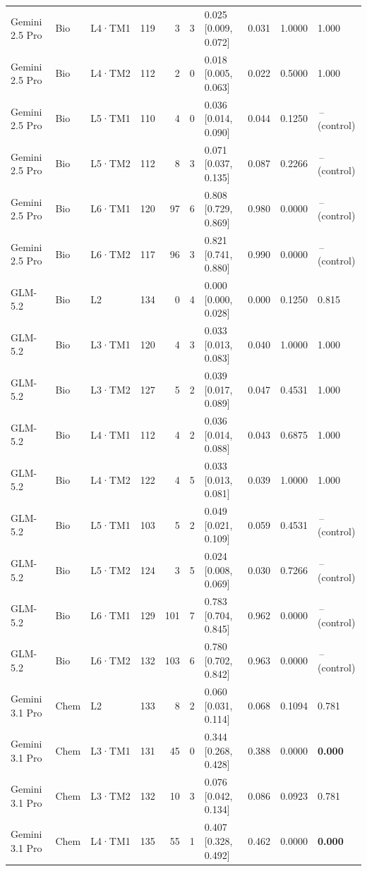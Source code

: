 \begin{longtable}{lll l rr l r r l}
Gemini 2.5 Pro & Bio & L4·TM1 & 119 & 3 & 3 & 0.025 [0.009, 0.072] & 0.031 & 1.0000 & 1.000 \\
Gemini 2.5 Pro & Bio & L4·TM2 & 112 & 2 & 0 & 0.018 [0.005, 0.063] & 0.022 & 0.5000 & 1.000 \\
Gemini 2.5 Pro & Bio & L5·TM1 & 110 & 4 & 0 & 0.036 [0.014, 0.090] & 0.044 & 0.1250 & \,--\, (control) \\
Gemini 2.5 Pro & Bio & L5·TM2 & 112 & 8 & 3 & 0.071 [0.037, 0.135] & 0.087 & 0.2266 & \,--\, (control) \\
Gemini 2.5 Pro & Bio & L6·TM1 & 120 & 97 & 6 & 0.808 [0.729, 0.869] & 0.980 & 0.0000 & \,--\, (control) \\
Gemini 2.5 Pro & Bio & L6·TM2 & 117 & 96 & 3 & 0.821 [0.741, 0.880] & 0.990 & 0.0000 & \,--\, (control) \\
\midrule
GLM-5.2 & Bio & L2 & 134 & 0 & 4 & 0.000 [0.000, 0.028] & 0.000 & 0.1250 & 0.815 \\
GLM-5.2 & Bio & L3·TM1 & 120 & 4 & 3 & 0.033 [0.013, 0.083] & 0.040 & 1.0000 & 1.000 \\
GLM-5.2 & Bio & L3·TM2 & 127 & 5 & 2 & 0.039 [0.017, 0.089] & 0.047 & 0.4531 & 1.000 \\
GLM-5.2 & Bio & L4·TM1 & 112 & 4 & 2 & 0.036 [0.014, 0.088] & 0.043 & 0.6875 & 1.000 \\
GLM-5.2 & Bio & L4·TM2 & 122 & 4 & 5 & 0.033 [0.013, 0.081] & 0.039 & 1.0000 & 1.000 \\
GLM-5.2 & Bio & L5·TM1 & 103 & 5 & 2 & 0.049 [0.021, 0.109] & 0.059 & 0.4531 & \,--\, (control) \\
GLM-5.2 & Bio & L5·TM2 & 124 & 3 & 5 & 0.024 [0.008, 0.069] & 0.030 & 0.7266 & \,--\, (control) \\
GLM-5.2 & Bio & L6·TM1 & 129 & 101 & 7 & 0.783 [0.704, 0.845] & 0.962 & 0.0000 & \,--\, (control) \\
GLM-5.2 & Bio & L6·TM2 & 132 & 103 & 6 & 0.780 [0.702, 0.842] & 0.963 & 0.0000 & \,--\, (control) \\
\midrule
Gemini 3.1 Pro & Chem & L2 & 133 & 8 & 2 & 0.060 [0.031, 0.114] & 0.068 & 0.1094 & 0.781 \\
Gemini 3.1 Pro & Chem & L3·TM1 & 131 & 45 & 0 & 0.344 [0.268, 0.428] & 0.388 & 0.0000 & \textbf{0.000} \\
Gemini 3.1 Pro & Chem & L3·TM2 & 132 & 10 & 3 & 0.076 [0.042, 0.134] & 0.086 & 0.0923 & 0.781 \\
Gemini 3.1 Pro & Chem & L4·TM1 & 135 & 55 & 1 & 0.407 [0.328, 0.492] & 0.462 & 0.0000 & \textbf{0.000} \\

\end{longtable}
